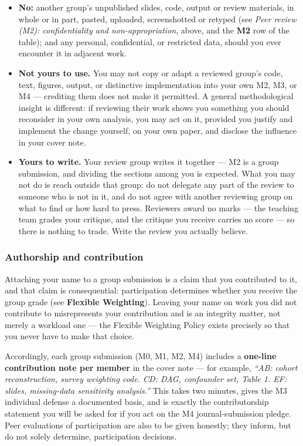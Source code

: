 \documentclass[
]{article}
\providecommand{\tightlist}{%
  \setlength{\itemsep}{0pt}\setlength{\parskip}{0pt}}
\begin{document}
\begin{itemize}
\tightlist
\item
  \textbf{No:} another group's unpublished slides, code, output or
  review materials, in whole or in part, pasted, uploaded, screenshotted
  or retyped (see \emph{Peer review (M2): confidentiality and
  non-appropriation}, above, and the \textbf{M2} row of the table); and
  any personal, confidential, or restricted data, should you ever
  encounter it in adjacent work.
\item
  \textbf{Not yours to use.} You may not copy or adapt a reviewed
  group's code, text, figures, output, or distinctive implementation
  into your own M2, M3, or M4 --- crediting them does not make it
  permitted. A general methodological insight is different: if reviewing
  their work shows you something you should reconsider in your own
  analysis, you may act on it, provided you justify and implement the
  change yourself, on your own paper, and disclose the influence in your
  cover note.
\item
  \textbf{Yours to write.} Your review group writes it together --- M2
  is a group submission, and dividing the sections among you is
  expected. What you may not do is reach outside that group: do not
  delegate any part of the review to someone who is not in it, and do
  not agree with another reviewing group on what to find or how hard to
  press. Reviewers award no marks --- the teaching team grades your
  critique, and the critique you receive carries no score --- so there
  is nothing to trade. Write the review you actually believe.
\end{itemize}

\subsubsection{Authorship and
contribution}\label{authorship-and-contribution}

Attaching your name to a group submission is a claim that you
contributed to it, and that claim is consequential: participation
determines whether you receive the group grade (see \textbf{Flexible
Weighting}). Leaving your name on work you did not contribute to
misrepresents your contribution and is an integrity matter, not merely a
workload one --- the Flexible Weighting Policy exists precisely so that
you never have to make that choice.

Accordingly, each group submission (M0, M1, M2, M4) includes a
\textbf{one-line contribution note per member} in the cover note --- for
example, \emph{``AB: cohort reconstruction, survey weighting code. CD:
DAG, confounder set, Table 1. EF: slides, missing-data sensitivity
analysis.''} This takes two minutes, gives the M3 individual defense a
documented basis, and is exactly the contributorship statement you will
be asked for if you act on the M4 journal-submission pledge. Peer
evaluations of participation are also to be given honestly; they inform,
but do not solely determine, participation decisions.
\end{document}

